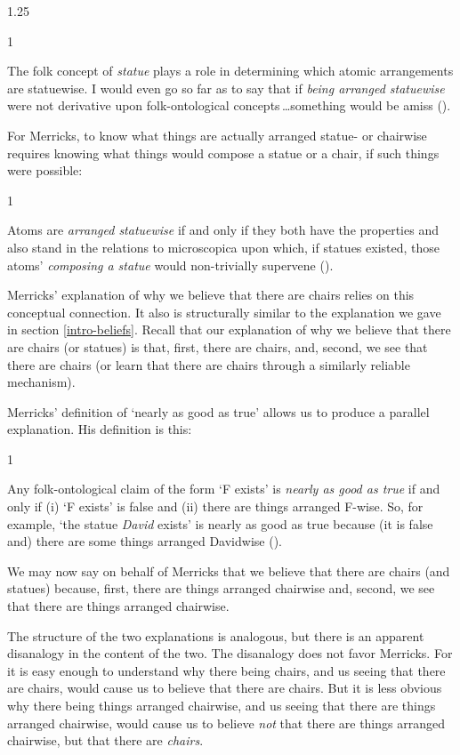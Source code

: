 \documentclass[11pt]{article}
\newenvironment{squote}{%
\begin{spacing}{1}
       	\begin{list}{}{%
\setlength{\labelwidth}{0pt}%
\rightmargin\leftmargin%
}
\item\relax
}{%
\end{list}%
\end{spacing}
}
\begin{document}
\begin{spacing}{1.25}
\begin{squote}
The folk concept of \emph{statue} plays a role in determining which
atomic arrangements are statuewise. I would even go so far as to say
that if \emph{being arranged statuewise} were not derivative upon
folk-ontological concepts\,\ldots something would be amiss
(\citeyear[8]{merricks2001a}).
\end{squote}

For Merricks, to know what things are actually arranged statue- or
chairwise requires knowing what things would compose a statue or a
chair, if such things were possible:

\begin{squote}
Atoms are \emph{arranged statuewise} if and only if they both have the
properties and also stand in the relations to microscopica upon which,
if statues existed, those atoms' \emph{composing a statue} would
non-trivially supervene (\citeyear[4]{merricks2001a}).
\end{squote}

Merricks' explanation of why we believe that there are chairs relies
on this conceptual connection.  It also is structurally similar to the
explanation we gave in section \ref{intro-beliefs}.  Recall that our
explanation of why we believe that there are chairs (or statues) is
that, first, there are chairs, and, second, we see that there are
chairs (or learn that there are chairs through a similarly reliable
mechanism).

Merricks' definition of `nearly as good as true' allows us to produce
a parallel explanation.  His definition is this:

\begin{squote}
Any folk-ontological claim of the form `F exists' is \emph{nearly as
  good as true} if and only if (i) `F exists' is false and (ii) there
are things arranged F-wise. So, for example, `the statue \emph{David}
exists' is nearly as good as true because (it is false and) there are
some things arranged Davidwise (\citeyear[171]{merricks2001a}).
\end{squote}

We may now say on behalf of Merricks that we believe that there are
chairs (and statues) because, first, there are things arranged
chairwise and, second, we see that there are things arranged
chairwise.

The structure of the two explanations is analogous, but there is an
apparent disanalogy in the content of the two.  The disanalogy does
not favor Merricks.  For it is easy enough to understand why there
being chairs, and us seeing that there are chairs, would cause us to
believe that there are chairs.  But it is less obvious why there being
things arranged chairwise, and us seeing that there are things
arranged chairwise, would cause us to believe {\em not} that there are
things arranged chairwise, but that there are {\em chairs}.


\end{spacing}
\end{document}
